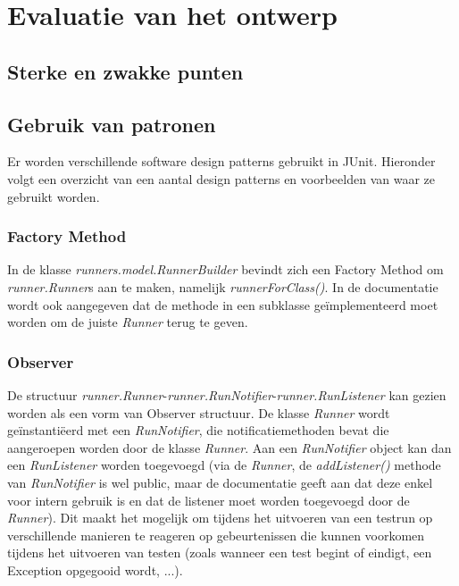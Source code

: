 \documentclass[i1]{oss}
\begin{document}
\section{Evaluatie van het ontwerp}


\subsection{Sterke en zwakke punten}

\subsection{Gebruik van patronen}

Er worden verschillende software design patterns gebruikt in JUnit. 
Hieronder volgt een overzicht van een aantal design patterns en voorbeelden van waar ze gebruikt worden.

\subsubsection{Factory Method}
In de klasse \emph{runners.model.RunnerBuilder} bevindt zich een Factory Method om \emph{runner.Runner}s aan te maken, namelijk \emph{runnerForClass()}. 
In de documentatie wordt ook aangegeven dat de methode in een subklasse ge\"implementeerd moet worden om de juiste \emph{Runner} terug te geven.

\subsubsection{Observer}
De structuur \emph{runner.Runner}-\emph{runner.RunNotifier}-\emph{runner.RunListener} kan gezien worden als een vorm van Observer structuur. 
De klasse \emph{Runner} wordt ge\"instanti\"eerd met een \emph{RunNotifier}, die notificatiemethoden bevat die aangeroepen worden door de klasse \emph{Runner}. 
Aan een \emph{RunNotifier} object kan dan een \emph{RunListener} worden toegevoegd (via de \emph{Runner}, de \emph{addListener()} methode van \emph{RunNotifier} is wel public, maar de documentatie geeft aan dat deze enkel voor intern gebruik is en dat de listener moet worden toegevoegd door de \emph{Runner}). 
Dit maakt het mogelijk om tijdens het uitvoeren van een testrun op verschillende manieren te reageren op gebeurtenissen die kunnen voorkomen tijdens het uitvoeren van testen (zoals wanneer een test begint of eindigt, een Exception opgegooid wordt, ...).
\end{document}
